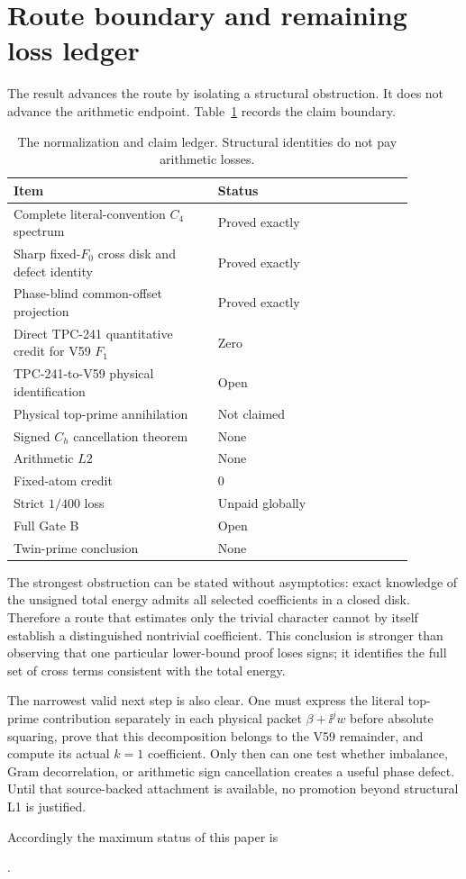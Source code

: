 \section{Route boundary and remaining loss ledger}\label{sec:boundary}

The result advances the route by isolating a structural obstruction.  It does
not advance the arithmetic endpoint.  Table~\ref{tab:ledger} records the
claim boundary.

\begin{table}[ht]
\centering
\small
\begin{tabular}{@{}p{0.45\linewidth}p{0.43\linewidth}@{}}
\toprule
Item & Status \\
\midrule
Complete literal-convention $C_4$ spectrum & Proved exactly \\
Sharp fixed-$F_0$ cross disk and defect identity & Proved exactly \\
Phase-blind common-offset projection & Proved exactly \\
Direct TPC-241 quantitative credit for V59 $F_1$ & Zero \\
TPC-241-to-V59 physical identification & Open \\
Physical top-prime annihilation & Not claimed \\
Signed $C_h$ cancellation theorem & None \\
Arithmetic $L2$ & None \\
Fixed-atom credit & $0$ \\
Strict $1/400$ loss & Unpaid globally \\
Full Gate B & Open \\
Twin-prime conclusion & None \\
\bottomrule
\end{tabular}
\caption{The normalization and claim ledger.  Structural identities do not
pay arithmetic losses.}\label{tab:ledger}
\end{table}

The strongest obstruction can be stated without asymptotics: exact knowledge
of the unsigned total energy admits all selected coefficients in a closed
disk.  Therefore a route that estimates only the trivial character cannot by
itself establish a distinguished nontrivial coefficient.  This conclusion is
stronger than observing that one particular lower-bound proof loses signs; it
identifies the full set of cross terms consistent with the total energy.

The narrowest valid next step is also clear.  One must express the literal
top-prime contribution separately in each physical packet
$\beta+\ii^j w$ before absolute squaring, prove that this decomposition belongs
to the V59 remainder, and compute its actual $k=1$ coefficient.  Only then can
one test whether imbalance, Gram decorrelation, or arithmetic sign
cancellation creates a useful phase defect.  Until that source-backed
attachment is available, no promotion beyond structural L1 is justified.

Accordingly the maximum status of this paper is
\begin{center}
\TPCstatus.
\end{center}
